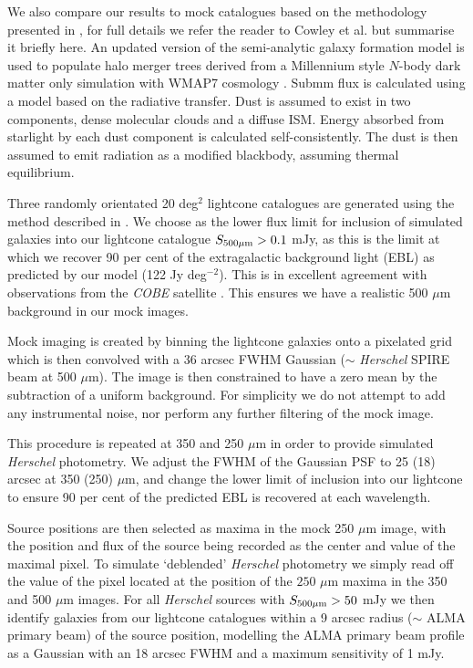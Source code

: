 We also compare our results to mock catalogues based on the methodology presented in \cite{Cowley14}, for full details we refer the reader to Cowley et al. but summarise it briefly here. An updated version of the \galform \citep[e.g.][Lacey et al. in preparation]{Cole00} semi-analytic galaxy formation model is used to populate halo merger trees \citep[e.g.][]{PCH08,Jiang14} derived from a Millennium style $N$-body dark matter only simulation \citep{Springel05,Guo13} with WMAP7 cosmology \citep{Komatsu11}.  Submm flux is calculated using a model based on the radiative transfer.  Dust is assumed to exist in two components,  dense molecular clouds and a diffuse ISM.  Energy absorbed from starlight by each dust component is calculated self-consistently. The dust is then assumed to emit radiation as a modified blackbody, assuming thermal equilibrium.  

Three randomly orientated 20 deg$^2$ lightcone catalogues are generated using the method described in \cite{Merson13}.  We choose as the lower flux limit for inclusion of simulated galaxies into our lightcone catalogue $S_{500\mu\rm{m}}>0.1$ mJy, as this is the limit at which we recover 90 per cent of the extragalactic background light (EBL) as predicted by our model (122 Jy deg$^{-2}$). This is in excellent agreement with observations from the \emph{COBE} satellite \citep[e.g.][]{Puget96,Fixsen98}. This ensures we have a realistic 500 $\mu$m  background in our mock images.  

Mock imaging is created by binning the lightcone galaxies onto a pixelated grid which is then convolved with a  36 arcsec FWHM Gaussian ($\sim$ \emph{Herschel} SPIRE beam at 500 $\mu$m).  The image is then constrained to have a zero mean by the subtraction of a uniform background.  For simplicity we do not attempt to add any instrumental noise, nor perform any further filtering of the mock image.  

This procedure is repeated at 350 and 250 $\mu$m in order to provide simulated \emph{Herschel} photometry.  We adjust the FWHM of the Gaussian PSF to 25 (18) arcsec at 350 (250) $\mu$m, and change the lower limit of inclusion into our lightcone to ensure 90 per cent of the predicted EBL is recovered at each wavelength.    

Source positions are then selected as maxima in the mock 250 $\mu$m image, with the position and flux of the source being recorded as the center and value of the maximal pixel.  To simulate `deblended' \emph{Herschel} photometry we simply read off the value of the pixel located at the position of the $250$ $\mu$m maxima in the 350 and 500 $\mu$m images. For all \emph{Herschel} sources with $S_{500\mu\rm{m}}>50$ mJy we then identify galaxies from our lightcone catalogues within a 9 arcsec radius ($\sim$ ALMA primary beam) of the source position, modelling the ALMA primary beam profile as a Gaussian with an 18 arcsec FWHM and a maximum sensitivity of 1 mJy.
